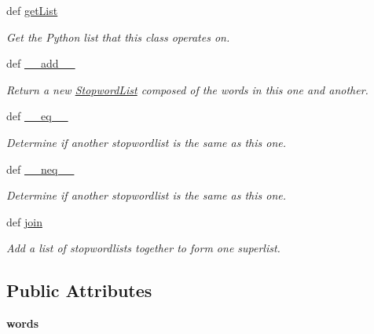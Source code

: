 \begin{DoxyCompactItemize}
def \hyperlink{classgographer_1_1utils_1_1_stopword_list_abcdb9d1269e342e5010debe0bac6d2ea}{get\-List}
\begin{DoxyCompactList}\small\item\em Get the Python list that this class operates on. \end{DoxyCompactList}\item 
def \hyperlink{classgographer_1_1utils_1_1_stopword_list_a3b1cec3a25c8c749e01df37e83af0e3b}{\-\_\-\-\_\-add\-\_\-\-\_\-}
\begin{DoxyCompactList}\small\item\em Return a new \hyperlink{classgographer_1_1utils_1_1_stopword_list}{Stopword\-List} composed of the words in this one and another. \end{DoxyCompactList}\item 
def \hyperlink{classgographer_1_1utils_1_1_stopword_list_a92eb17a08e00c4ccbcb78feb47edc569}{\-\_\-\-\_\-eq\-\_\-\-\_\-}
\begin{DoxyCompactList}\small\item\em Determine if another stopwordlist is the same as this one. \end{DoxyCompactList}\item 
def \hyperlink{classgographer_1_1utils_1_1_stopword_list_a75f275910952b6c749a8ae01a4c62e56}{\-\_\-\-\_\-neq\-\_\-\-\_\-}
\begin{DoxyCompactList}\small\item\em Determine if another stopwordlist is the same as this one. \end{DoxyCompactList}\item 
def \hyperlink{classgographer_1_1utils_1_1_stopword_list_a2880ccda68705f69321ef8f849ea186b}{join}
\begin{DoxyCompactList}\small\item\em Add a list of stopwordlists together to form one superlist. \end{DoxyCompactList}\end{DoxyCompactItemize}
\subsection*{Public Attributes}
\begin{DoxyCompactItemize}
\item 
\hypertarget{classgographer_1_1utils_1_1_stopword_list_ae674a552205f5e148df9bd093e439cfe}{{\bfseries words}}\label{classgographer_1_1utils_1_1_stopword_list_ae674a552205f5e148df9bd093e439cfe}

\end{DoxyCompactItemize}


